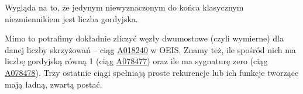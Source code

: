 Wygląda na to, że jedynym niewyznaczonym do końca klasycznym niezmiennikiem jest liczba gordyjska.

Mimo to potrafimy dokładnie zliczyć węzły dwumostowe (czyli wymierne) dla danej liczby skrzyżowań -- ciąg \href{https://oeis.org/A018240}{A018240} w OEIS.
Znamy też, ile spośród nich ma liczbę gordyjską równą 1 (ciąg \href{https://oeis.org/A078477}{A078477}) oraz ile ma sygnaturę zero (ciąg \href{https://oeis.org/A078478}{A078478}).
Trzy ostatnie ciągi spełniają proste rekurencje lub ich funkcje tworzące mają ładną, zwartą postać.

%


